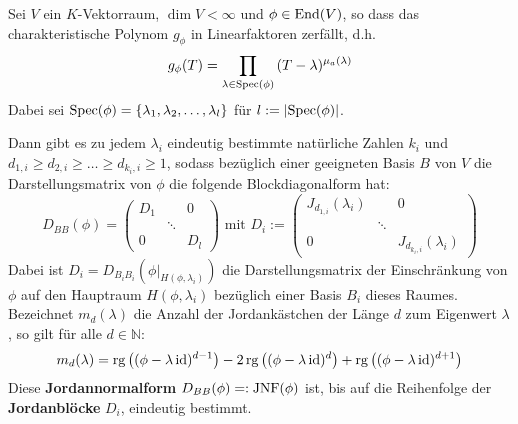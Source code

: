 \documentclass[parskip,a4paper,twoside,DIV15,BCOR12mm]{scrbook}
\begin{document}
\begin{theo}[Jordannormalform]
\label{Satz 14.5}
Sei \(V\) ein \(K\)-Vektorraum, \(\dim V<\infty\) und \(\phi\in\operatorname{End}(V)\), so
dass das charakteristische Polynom \(g_{\phi}\) in Linearfaktoren zerfällt,
d.h.
\[
g_{\phi}(T)=\prod_{\lambda\in\operatorname{Spec}(\phi)}{(T-\lambda)^{\mu_{a}(\lambda)}}
\]
Dabei sei \(\operatorname{Spec}(\phi)=\{\lambda_{1},\lambda_{2},\ldots,\lambda_{l}\}\) für
\(l:=\lvert\operatorname{Spec}(\phi)\rvert\).

Dann gibt es zu jedem \(\lambda_{i}\) eindeutig bestimmte natürliche Zahlen
\(k_{i}\) und \(d_{1,i}\geq d_{2,i}\geq\ldots\geq d_{k_{i},i}\geq1\), sodass
bezüglich einer geeigneten Basis \(B\) von \(V\) die Darstellungsmatrix von
\(\phi\) die folgende Blockdiagonalform hat:
\[
D_{BB}(\phi)=\begin{pmatrix}
    D_{1}&&0\\
    &\ddots&\\
    0&&D_{l}
\end{pmatrix}\text { mit }
    D_{i}:=\begin{pmatrix}
	J_{d_{1,i}}(\lambda_{i})&&0\\
	&\ddots&\\
	0&&J_{d_{k_{i},i}}(\lambda_{i})
    \end{pmatrix}
\]
Dabei ist \(D_{i}=D_{B_{i}B_{i}}\left(\phi|_{H(\phi,\lambda_{i})}\right)\) die
Darstellungsmatrix der Einschränkung von \(\phi\) auf den Hauptraum
\(H(\phi,\lambda_{i})\) bezüglich einer Basis \(B_{i}\) dieses Raumes.\\
Bezeichnet \(m_{d}(\lambda)\) die Anzahl der Jordankästchen der Länge \(d\)
zum Eigenwert \(\lambda\), so gilt für alle \(d\in\mathbb{N}\):
\[
m_{d}(\lambda)=\operatorname{rg}\left((\phi-\lambda\operatorname{id})^{d-1}\right)-
    2\operatorname{rg}\left((\phi-\lambda\operatorname{id})^{d}\right)+
    \operatorname{rg}\left((\phi-\lambda\operatorname{id})^{d+1}\right)
\]
Diese \textbf{Jordannormalform} \(D_{BB}(\phi)=:\operatorname{JNF}(\phi)\) ist, bis auf die
Reihenfolge der \textbf{Jordanblöcke} \(D_{i}\), eindeutig bestimmt.
\end{theo}
\end{document}
